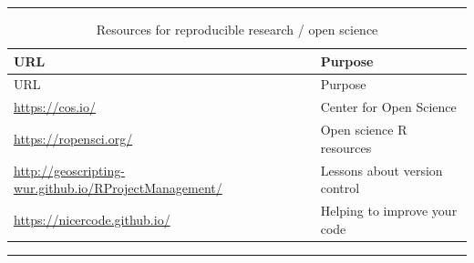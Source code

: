 \documentclass[
]{book}
\begin{document}
\begin{center}\rule{0.5\linewidth}{0.5pt}\end{center}

\begin{longtable}[]{@{}
  >{\raggedright\arraybackslash}p{}
  >{\raggedright\arraybackslash}p{}@{}}
\caption{Resources for reproducible research / open science}\tabularnewline
\toprule\noalign{}
\begin{minipage}[b]{\linewidth}\raggedright
URL
\end{minipage} & \begin{minipage}[b]{\linewidth}\raggedright
Purpose
\end{minipage} \\
\midrule\noalign{}
\endfirsthead
\toprule\noalign{}
\begin{minipage}[b]{\linewidth}\raggedright
URL
\end{minipage} & \begin{minipage}[b]{\linewidth}\raggedright
Purpose
\end{minipage} \\
\midrule\noalign{}
\endhead
\bottomrule\noalign{}
\endlastfoot
\url{https://cos.io/} & Center for Open Science \\
\url{https://ropensci.org/} & Open science R resources \\
\url{http://geoscripting-wur.github.io/RProjectManagement/} & Lessons about version control \\
\url{https://nicercode.github.io/} & Helping to improve your code \\
\end{longtable}

\begin{center}\rule{0.5\linewidth}{0.5pt}\end{center}
\end{document}

